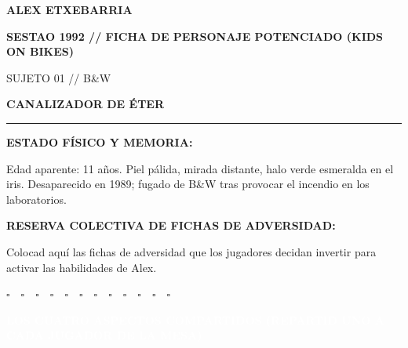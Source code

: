 \documentclass[10pt,a4paper,oneside]{book}
\newcommand{\strip}[1]{%
  \vspace{1.5mm}\noindent
  \colorbox{EterAlien}{\parbox{\dimexpr\linewidth-2\fboxsep\relax}{%
    \textcolor{white}{\industrialfont\bfseries\small\MakeUppercase{#1}}}}\par
  \vspace{1.5mm}}
\begin{document}
\pagecolor{Paper}

\noindent
\begin{minipage}[c]{0.70\linewidth}
  {\industrialfont\bfseries\fontsize{24}{25}\selectfont\color{CarbonSestao}ALEX ETXEBARRIA}\par
  \vspace{1mm}
  {\industrialfont\bfseries\small\color{EterAlien}SESTAO 1992 \textcolor{OxidoSestao}{//} FICHA DE PERSONAJE POTENCIADO (KIDS ON BIKES)}
\end{minipage}%
\hfill
\begin{minipage}[c]{0.26\linewidth}
  \raggedleft
  {\terminalfont\scriptsize\color{InkSoft}SUJETO 01 // B\&W}\par
  {\industrialfont\bfseries\large\color{EterAlien}CANALIZADOR DE ÉTER}
\end{minipage}

\vspace{2mm}
\textcolor{EterAlien}{\rule{\linewidth}{1.4pt}}
\vspace{2mm}

\begin{minipage}[t]{0.48\linewidth}
  \textbf{\industrialfont\normalsize ESTADO FÍSICO Y MEMORIA:}\par
  {\small Edad aparente: 11 años. Piel pálida, mirada distante, halo verde esmeralda en el iris. Desaparecido en 1989; fugado de B\&W tras provocar el incendio en los laboratorios.}
\end{minipage}\hfill
\begin{minipage}[t]{0.48\linewidth}
  \textbf{\industrialfont\normalsize RESERVA COLECTIVA DE FICHAS DE ADVERSIDAD:}\par
  \vspace{1mm}
  {\scriptsize Colocad aquí las fichas de adversidad que los jugadores decidan invertir para activar las habilidades de Alex.}\par
  \vspace{2mm}
  \large $\square\quad\square\quad\square\quad\square\quad\square\quad\square\quad\square\quad\square\quad\square\quad\square\quad\square\quad\square$
\end{minipage}

\strip{Los Cuatro Aspectos Compartidos (Repartid uno a cada jugador de la mesa)}
\end{document}
